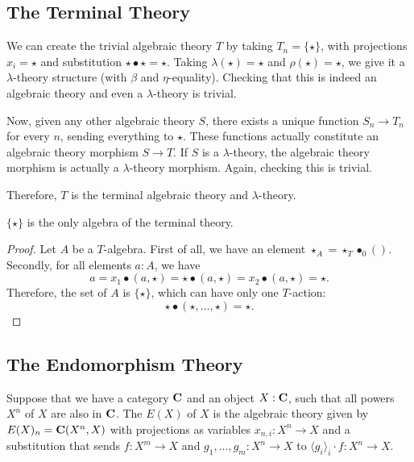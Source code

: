 \subsection{The Terminal Theory}
\begin{example}
  We can create the trivial algebraic theory $ T $ by taking $ T_n = \{ \star \} $, with projections $ x_i = \star $ and substitution $ \star \bullet \star = \star $. Taking $ \lambda(\star) = \star $ and $ \rho(\star) = \star $, we give it a $ \lambda $-theory structure (with $ \beta $ and $ \eta $-equality). Checking that this is indeed an algebraic theory and even a $ \lambda $-theory is trivial.

  Now, given any other algebraic theory $ S $, there exists a unique function $ S_n \to T_n $ for every $ n $, sending everything to $ \star $. These functions actually constitute an algebraic theory morphism $ S \to T $. If $ S $ is a $ \lambda $-theory, the algebraic theory morphism is actually a $ \lambda $-theory morphism. Again, checking this is trivial.

  Therefore, $ T $ is the terminal algebraic theory and $ \lambda $-theory.
\end{example}

\begin{lemma}
  $ \{ \star \} $ is the only algebra of the terminal theory.
\end{lemma}
\begin{proof}
  Let $ A $ be a $ T $-algebra. First of all, we have an element $ \star_A = \star_T \bullet_{0} () $. Secondly, for all elements $ a: A $, we have
  \[ a = x_1 \bullet (a, \star) = \star \bullet (a, \star) = x_2 \bullet (a, \star) = \star. \]
  Therefore, the set of $ A $ is $ \{ \star \} $, which can have only one $ T $-action:
  \[ \star \bullet (\star, \dots, \star) = \star. \]
\end{proof}

\subsection{The Endomorphism Theory}

\begin{definition}\label{def:endomorphism-theory}
  Suppose that we have a category $ \mathbf{C} $ and an object $ X: \mathbf{C} $, such that all powers $ X^n $ of $ X $ are also in $ \mathbf{C} $.
  The  $ E(X) $ of $ X $ is the algebraic theory given by $ E(X)_n = \mathbf{C}(X^n, X) $ with projections as variables $ x_{n, i}: X^n \to X $ and a substitution that sends $ f: X^m \to X $ and $ g_1, \dots, g_m: X^n \to X $ to $ \langle g_i \rangle_i \cdot f: X^n \to X $.
\end{definition}

